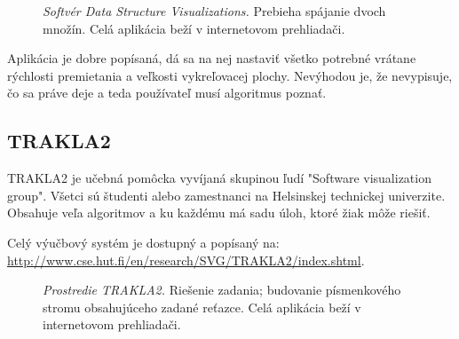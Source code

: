 \begin{figure}
\centering
{}
\caption{\emph{Softvér Data Structure Visualizations.} Prebieha spájanie dvoch 
množín. Celá aplikácia beží v internetovom prehliadači.}
\label{img:vis:galles}
\end{figure}

Aplikácia je dobre popísaná, dá sa na nej nastaviť všetko potrebné vrátane 
rýchlosti premietania a veľkosti vykreľovacej plochy. Nevýhodou je, že 
nevypisuje, čo sa práve deje a teda používateľ musí algoritmus poznať.

\subsection{TRAKLA2}\label{sec:trakla}

TRAKLA2 je učebná pomôcka vyvíjaná skupinou ľudí "Software visualization 
group". Všetci sú študenti alebo zamestnanci na Helsinskej technickej 
univerzite. Obsahuje veľa algoritmov a ku každému má sadu úloh, ktoré žiak 
môže riešiť. 

Celý výučbový systém je dostupný a popísaný na: 
\url{http://www.cse.hut.fi/en/research/SVG/TRAKLA2/index.shtml}.

\begin{figure}
\centering
{}
\caption{\emph{Prostredie TRAKLA2.} Riešenie zadania; budovanie písmenkového 
stromu obsahujúceho zadané reťazce. Celá aplikácia beží v internetovom 
prehliadači.}
\label{img:vis:trakla2}
\end{figure}

